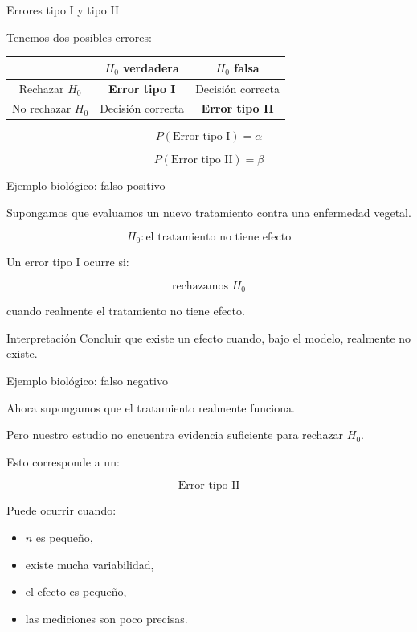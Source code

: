\documentclass[11pt, aspectratio=169]{beamer}
\begin{document}
\begin{frame}{Errores tipo I y tipo II}

Tenemos dos posibles errores:

\begin{center}
\begin{tabular}{c|cc}
& $H_0$ verdadera & $H_0$ falsa\\
\hline
Rechazar $H_0$ &
\textbf{Error tipo I} &
Decisión correcta\\
No rechazar $H_0$ &
Decisión correcta &
\textbf{Error tipo II}
\end{tabular}
\end{center}

\vspace{0.3cm}

\[
P(\text{Error tipo I})=\alpha
\]

\[
P(\text{Error tipo II})=\beta
\]

\end{frame}

\begin{frame}{Ejemplo biológico: falso positivo}

Supongamos que evaluamos un nuevo tratamiento contra una enfermedad vegetal.

\[
H_0:\text{el tratamiento no tiene efecto}
\]

Un error tipo I ocurre si:

\[
\text{rechazamos }H_0
\]

cuando realmente el tratamiento no tiene efecto.

\begin{block}{Interpretación}
Concluir que existe un efecto cuando, bajo el modelo, realmente
no existe.
\end{block}

\end{frame}
\begin{frame}{Ejemplo biológico: falso negativo}

Ahora supongamos que el tratamiento realmente funciona.

Pero nuestro estudio no encuentra evidencia suficiente para rechazar $H_0$.

Esto corresponde a un:

\[
\boxed{\text{Error tipo II}}
\]

Puede ocurrir cuando:

\begin{itemize}
    \item $n$ es pequeño,
    \item existe mucha variabilidad,
    \item el efecto es pequeño,
    \item las mediciones son poco precisas.
\end{itemize}

\end{frame}
\end{document}
